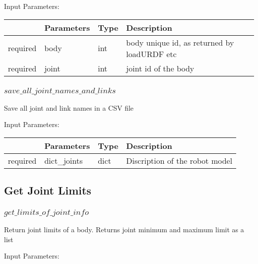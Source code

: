 \documentclass[
	ngerman,
	accentcolor=9c,%
	type=intern,
	marginpar=false
	]{tudapub}
\begin{document}
\vspace{0.5cm}
\noindent Input Parameters:
\vspace{0.5cm}

\begin{tabular}{|p{}|p{}|p{}| p{}|}
\hline
 & \textbf{Parameters} & \textbf{Type} & \textbf{Description} \\
\hline
required & body & int & body unique id, as returned by loadURDF etc\\
\hline
required & joint & int & joint id of the body\\
\hline

\end{tabular}
\vspace{0.5cm}



\subsubsection{$save\_all\_joint\_names\_and\_links$}
\noindent Save all joint and link names in a CSV file

\vspace{0.5cm}
\noindent Input Parameters:
\vspace{0.5cm}

\begin{tabular}{|p{}|p{}|p{}| p{}|}
\hline
 & \textbf{Parameters} & \textbf{Type} & \textbf{Description} \\
\hline
required & dict\_joints & dict &  Discription of the robot model\\
\hline

\end{tabular}
\vspace{0.5cm}




\subsection{Get Joint Limits}
\subsubsection{$get\_limits\_of\_joint\_info$}
\noindent Return joint limits of a body. Returns joint minimum and maximum limit as a list 


\vspace{0.5cm}
\noindent Input Parameters:
\vspace{0.5cm}
\end{document}
